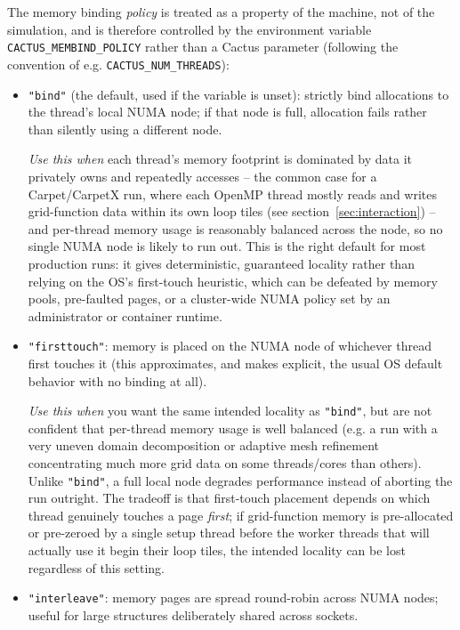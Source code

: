 The memory binding \emph{policy} is treated as a property of the
machine, not of the simulation, and is therefore controlled by the
environment variable \texttt{CACTUS\_MEMBIND\_POLICY} rather than a
Cactus parameter (following the convention of e.g.
\texttt{CACTUS\_NUM\_THREADS}):
\begin{itemize}
\item \texttt{"bind"} (the default, used if the variable is unset):
  strictly bind allocations to the thread's local NUMA node; if that
  node is full, allocation fails rather than silently using a
  different node.

  \emph{Use this when} each thread's memory footprint is dominated by
  data it privately owns and repeatedly accesses -- the common case for
  a Carpet/CarpetX run, where each OpenMP thread mostly reads and
  writes grid-function data within its own loop tiles (see
  section~\ref{sec:interaction}) -- and per-thread memory usage is
  reasonably balanced across the node, so no single NUMA node is likely
  to run out. This is the right default for most production runs: it
  gives deterministic, guaranteed locality rather than relying on the
  OS's first-touch heuristic, which can be defeated by memory pools,
  pre-faulted pages, or a cluster-wide NUMA policy set by an
  administrator or container runtime.
\item \texttt{"firsttouch"}: memory is placed on the NUMA node of
  whichever thread first touches it (this approximates, and makes
  explicit, the usual OS default behavior with no binding at all).

  \emph{Use this when} you want the same intended locality as
  \texttt{"bind"}, but are not confident that per-thread memory usage
  is well balanced (e.g. a run with a very uneven domain decomposition
  or adaptive mesh refinement concentrating much more grid data on some
  threads/cores than others). Unlike \texttt{"bind"}, a full local node
  degrades performance instead of aborting the run outright. The
  tradeoff is that first-touch placement depends on which thread
  genuinely touches a page \emph{first}; if grid-function memory is
  pre-allocated or pre-zeroed by a single setup thread before the
  worker threads that will actually use it begin their loop tiles, the
  intended locality can be lost regardless of this setting.
\item \texttt{"interleave"}: memory pages are spread round-robin
  across NUMA nodes; useful for large structures deliberately shared
  across sockets.


\end{itemize}
